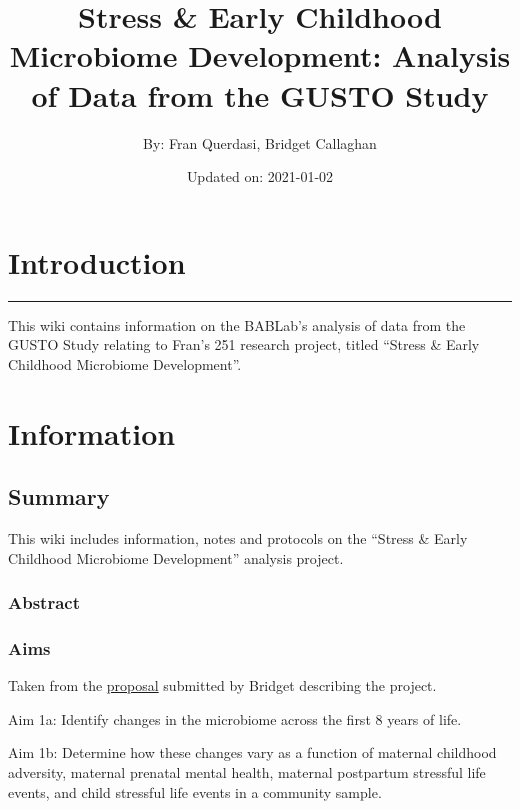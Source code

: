 \documentclass[
]{book}
\title{Stress \& Early Childhood Microbiome Development: Analysis of Data from the GUSTO Study}
\author{By: Fran Querdasi, Bridget Callaghan}
\date{Updated on: 2021-01-02}
\begin{document}
\maketitle

{
\setcounter{tocdepth}{1}
\tableofcontents
}
\hypertarget{introduction}{%
\chapter{Introduction}\label{introduction}}

\begin{center}\rule{0.5\linewidth}{0.5pt}\end{center}

This wiki contains information on the BABLab's analysis of data from the GUSTO Study relating to Fran's 251 research project, titled ``Stress \& Early Childhood Microbiome Development''.

\hypertarget{information}{%
\chapter{Information}\label{information}}

\hypertarget{summary}{%
\section{Summary}\label{summary}}

This wiki includes information, notes and protocols on the ``Stress \& Early Childhood Microbiome Development'' analysis project.

\hypertarget{abstract}{%
\subsection{Abstract}\label{abstract}}

\hypertarget{aims}{%
\subsection{Aims}\label{aims}}

Taken from the \href{https://ucla.app.box.com/file/740587024475}{proposal} submitted by Bridget describing the project.

Aim 1a: Identify changes in the microbiome across the first 8 years of life.

Aim 1b: Determine how these changes vary as a function of maternal childhood adversity, maternal prenatal mental health, maternal postpartum stressful life events, and child stressful life events in a community sample.
\end{document}

